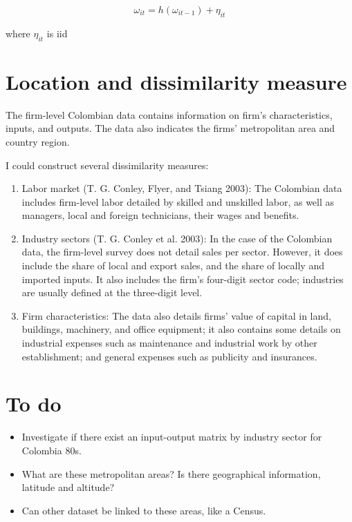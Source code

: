 \documentclass[
]{article}
\providecommand{\tightlist}{%
  \setlength{\itemsep}{0pt}\setlength{\parskip}{0pt}}\usepackage{longtable,booktabs,array}
\begin{document}
\[
\omega_{it}=h(\omega_{it-1})+\eta_{it}
\]

where \(\eta_{it}\) is iid

\hypertarget{location-and-dissimilarity-measure}{%
\section{Location and dissimilarity
measure}\label{location-and-dissimilarity-measure}}

The firm-level Colombian data contains information on firm's
characteristics, inputs, and outputs. The data also indicates the firms'
metropolitan area and country region.

I could construct several dissimilarity measures:

\begin{enumerate}
\def\labelenumi{\arabic{enumi}.}
\tightlist
\item
  Labor market (T. G. Conley, Flyer, and Tsiang 2003): The Colombian
  data includes firm-level labor detailed by skilled and unskilled
  labor, as well as managers, local and foreign technicians, their wages
  and benefits.
\item
  Industry sectors (T. G. Conley et al. 2003): In the case of the
  Colombian data, the firm-level survey does not detail sales per
  sector. However, it does include the share of local and export sales,
  and the share of locally and imported inputs. It also includes the
  firm's four-digit sector code; industries are usually defined at the
  three-digit level.
\item
  Firm characteristics: The data also details firms' value of capital in
  land, buildings, machinery, and office equipment; it also contains
  some details on industrial expenses such as maintenance and industrial
  work by other establishment; and general expenses such as publicity
  and insurances.
\end{enumerate}

\hypertarget{to-do}{%
\section{To do}\label{to-do}}

\begin{itemize}
\tightlist
\item
  Investigate if there exist an input-output matrix by industry sector
  for Colombia 80s.
\item
  What are these metropolitan areas? Is there geographical information,
  latitude and altitude?
\item
  Can other dataset be linked to these areas, like a Census.
\end{itemize}
\end{document}
